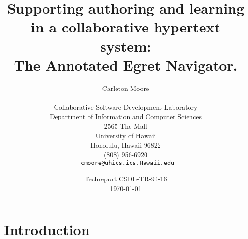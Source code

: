 



\title{Supporting authoring and learning\\ in a collaborative hypertext
system:\\ The Annotated Egret Navigator.}

\author {Carleton Moore\\
\\ Collaborative Software Development Laboratory\\ Department of
Information and Computer Sciences\\ 2565 The Mall\\ University of Hawaii\\
Honolulu, Hawaii 96822\\ (808) 956-6920\\ {\tt
cmoore@uhics.ics.Hawaii.edu}} \date{Techreport CSDL-TR-94-16\\ \today}

\maketitle

\tableofcontents

\newpage

\section{Introduction}
\label{sec:introduction}


